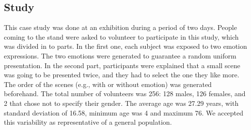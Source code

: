 \subsection{Study}

This case study was done at an exhibition during a period of two days. People coming to the stand were asked to volunteer to participate in this study, which was divided in to parts. In the first one, each subject was exposed to two emotion expressions. %
The two emotions were generated to guarantee a random uniform presentation. In the second part, participants were explained that a small scene was going to be presented twice, and they had to select the one they like more. The order of the scenes (e.g., with or without emotion) was generated beforehand. The total number of volunteers was 256: 128 males, 126 females, and 2 that chose not to specify their gender. The average age was 27.29 years, with standard deviation of 16.58, minimum age was 4 and maximum 76. We accepted this variability as representative of a general population.
